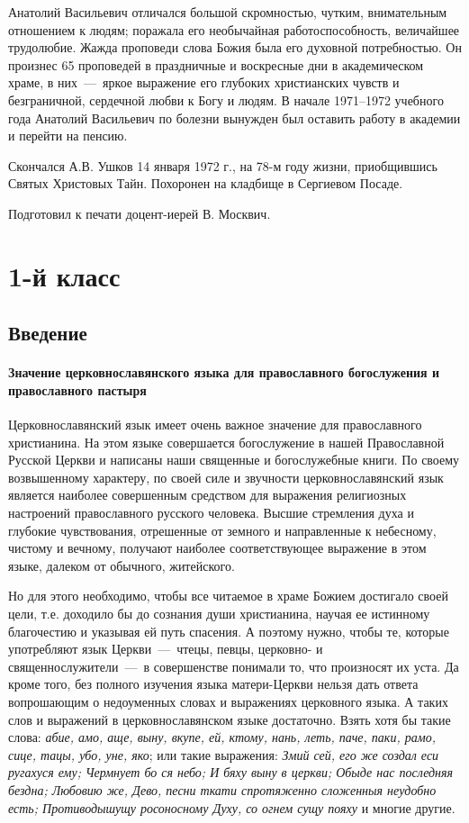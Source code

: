 \documentclass[11pt,a4paper,oneside]{memoir}
\begin{document}
Анатолий Васильевич отличался большой скромностью, чутким, внимательным отношением к людям; поражала его необычайная работоспособность, величайшее трудолюбие. Жажда проповеди слова Божия была его духовной потребностью. Он произнес 65 проповедей в праздничные и воскресные дни в академическом храме, в них~---~яркое выражение его глубоких христианских чувств и безграничной, сердечной любви к Богу и людям. В начале 1971--1972 учебного года Анатолий Васильевич по болезни вынужден был оставить работу в академии и перейти на пенсию.

Скончался А.В. Ушков 14 января 1972 г., на 78-м году жизни, приобщившись Святых Христовых Тайн. Похоронен на кладбище в Сергиевом Посаде.

\medskip
Подготовил к печати доцент-иерей В. Москвич.

\chapter*{1-й класс}
\label{ch:firstgrade}
\section*{Введение}
\label{sec:intro}
\subsubsection[Значение церковнославянского языка]{Значение церковнославянского языка для православного богослужения и православного пастыря}

Церковнославянский язык имеет очень важное значение для православного христианина. На этом языке совершается богослужение в нашей Православной Русской Церкви и написаны наши священные и богослужебные книги. По своему возвышенному характеру, по своей силе и звучности церковнославянский язык является наиболее совершенным средством для выражения религиозных настроений православного русского человека. Высшие стремления духа и глубокие чувствования, отрешенные от земного и направленные к небесному, чистому и вечному, получают наиболее соответствующее выражение в этом языке, далеком от обычного, житейского.

Но для этого необходимо, чтобы все читаемое в храме Божием достигало своей цели, т.е. доходило бы до сознания души христианина, научая ее истинному благочестию и указывая ей путь спасения. А поэтому нужно, чтобы те, которые употребляют язык Церкви~---~чтецы, певцы, церковно- и священнослужители~---~в совершенстве понимали то, что произносят их уста. Да кроме того, без полного изучения языка матери-Церкви нельзя дать ответа вопрошающим о недоуменных словах и выражениях церковного языка. А таких слов и выражений в церковнославянском языке достаточно. Взять хотя бы такие слова: \emph{абие, амо, аще, выну, вкупе, ей, ктому, нань, леть, паче, паки, рамо, сице, тацы, убо, уне, яко}; или такие выражения: \emph{Змий сей, его же создал еси ругахуся ему; Чермнует бо ся небо; И бяху выну в церкви; Обыде нас последняя бездна; Любовию же, Дево, песни ткати спротяженно сложенныя неудобно есть; Противодышущу росоносному Духу, со огнем сущу пояху} и многие другие.
\end{document}

